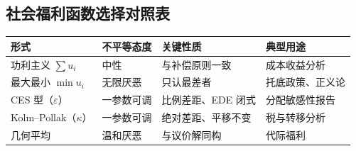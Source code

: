 \subsection{社会福利函数选择对照表}

\begin{center}
\small
\begin{tabular}{llll}
\toprule
形式 & 不平等态度 & 关键性质 & 典型用途 \\
\midrule
功利主义 $\sum u_i$ & 中性 & 与补偿原则一致 & 成本收益分析 \\
最大最小 $\min u_i$ & 无限厌恶 & 只认最差者 & 托底政策、正义论 \\
CES 型（$\varepsilon$） & 一参数可调 & 比例差距、EDE 闭式 & 分配敏感性报告 \\
Kolm--Pollak（$\kappa$） & 一参数可调 & 绝对差距、平移不变 & 税与转移分析 \\
几何平均 & 温和厌恶 & 与议价解同构 & 代际福利 \\
\bottomrule
\end{tabular}
\end{center}
